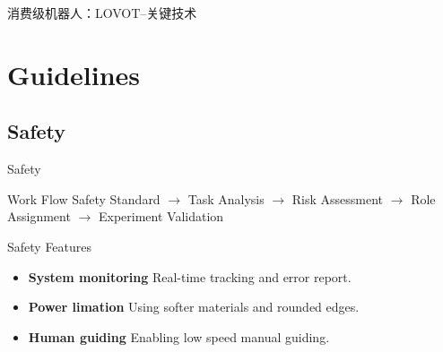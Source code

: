 \documentclass{beamer}
\begin{document}
\begin{frame}{消费级机器人：LOVOT--关键技术}
\end{frame}

\section{Guidelines}

\subsection{Safety}
\begin{frame}{Safety}

\begin{block}{Work Flow}
Safety Standard $\rightarrow$ Task Analysis $\rightarrow$ Risk Assessment $\rightarrow$ Role Assignment $\rightarrow$ Experiment Validation
\end{block}

\vspace{5mm}

\begin{block}{Safety Features}
\begin{itemize}
\item \textbf{System monitoring} Real-time tracking and error report.
\item \textbf{Power limation} Using softer materials and rounded edges.
\item \textbf{Human guiding} Enabling low speed manual guiding.
\end{itemize}
\end{block}

\end{frame}
\end{document}
